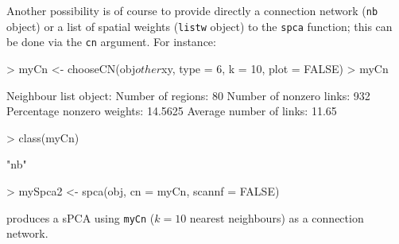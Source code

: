 \documentclass{article}
\begin{document}
Another possibility is of course to provide directly a connection
network (\texttt{nb} object) or a list of spatial weights
(\texttt{listw} object) to the \texttt{spca} function; this can be done via the \texttt{cn} argument.
For instance:
\begin{Schunk}
\begin{Sinput}
> myCn <- chooseCN(obj$other$xy, type = 6, k = 10, plot = FALSE)
> myCn
\end{Sinput}
\begin{Soutput}
Neighbour list object:
Number of regions: 80 
Number of nonzero links: 932 
Percentage nonzero weights: 14.5625 
Average number of links: 11.65 
\end{Soutput}
\begin{Sinput}
> class(myCn)
\end{Sinput}
\begin{Soutput}
[1] "nb"
\end{Soutput}
\begin{Sinput}
> mySpca2 <- spca(obj, cn = myCn, scannf = FALSE)
\end{Sinput}
\end{Schunk}
\noindent produces a sPCA using \texttt{myCn} ($k=10$ nearest
neighbours) as a connection network.
\\
\end{document}
